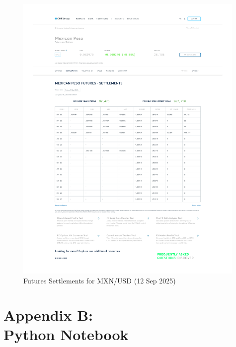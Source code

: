 \documentclass[11pt,a4paper]{article} %
\let\oldsection\section
\renewcommand{\section}{%
    \clearpage
    \thispagestyle{myfancy}%
    \oldsection
  }
\begin{document}
\begin{figure}[h]
  \centering
  \includegraphics[width=0.99\textwidth]{appendix/MXNUSD12SEP.pdf}
  \caption{Futures Settlements for MXN/USD (12 Sep 2025)}
  \label{fig:mxnusd_settlements}
\end{figure}

\section{Appendix B: \\ Python Notebook }

\end{document}
